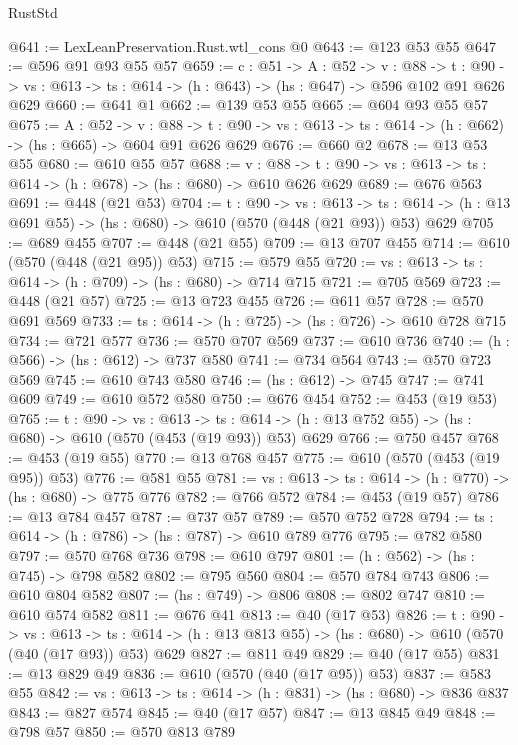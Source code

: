 \begin{lexlean}{RustStd}
\begin{coremodule}
@641 := LexLeanPreservation.Rust.wtl_cons @0
@643 := @123 @53 @55
@647 := @596 @91 @93 @55 @57
@659 := {c : @51} ->
  {A : @52} ->
  {v : @88} ->
  {t : @90} -> {vs : @613} -> {ts : @614} -> (h : @643) -> (hs : @647) -> @596 @102 @91 @626 @629
@660 := @641 @1
@662 := @139 @53 @55
@665 := @604 @93 @55 @57
@675 := {A : @52} ->
  {v : @88} ->
  {t : @90} -> {vs : @613} -> {ts : @614} -> (h : @662) -> (hs : @665) -> @604 @91 @626 @629
@676 := @660 @2
@678 := @13 @53 @55
@680 := @610 @55 @57
@688 := {v : @88} ->
  {t : @90} -> {vs : @613} -> {ts : @614} -> (h : @678) -> (hs : @680) -> @610 @626 @629
@689 := @676 @563
@691 := @448 (@21 @53)
@704 := {t : @90} ->
  {vs : @613} ->
  {ts : @614} -> (h : @13 @691 @55) -> (hs : @680) -> @610 (@570 (@448 (@21 @93)) @53) @629
@705 := @689 @455
@707 := @448 (@21 @55)
@709 := @13 @707 @455
@714 := @610 (@570 (@448 (@21 @95)) @53)
@715 := @579 @55
@720 := {vs : @613} -> {ts : @614} -> (h : @709) -> (hs : @680) -> @714 @715
@721 := @705 @569
@723 := @448 (@21 @57)
@725 := @13 @723 @455
@726 := @611 @57
@728 := @570 @691 @569
@733 := {ts : @614} -> (h : @725) -> (hs : @726) -> @610 @728 @715
@734 := @721 @577
@736 := @570 @707 @569
@737 := @610 @736
@740 := (h : @566) -> (hs : @612) -> @737 @580
@741 := @734 @564
@743 := @570 @723 @569
@745 := @610 @743 @580
@746 := (hs : @612) -> @745
@747 := @741 @609
@749 := @610 @572 @580
@750 := @676 @454
@752 := @453 (@19 @53)
@765 := {t : @90} ->
  {vs : @613} ->
  {ts : @614} -> (h : @13 @752 @55) -> (hs : @680) -> @610 (@570 (@453 (@19 @93)) @53) @629
@766 := @750 @457
@768 := @453 (@19 @55)
@770 := @13 @768 @457
@775 := @610 (@570 (@453 (@19 @95)) @53)
@776 := @581 @55
@781 := {vs : @613} -> {ts : @614} -> (h : @770) -> (hs : @680) -> @775 @776
@782 := @766 @572
@784 := @453 (@19 @57)
@786 := @13 @784 @457
@787 := @737 @57
@789 := @570 @752 @728
@794 := {ts : @614} -> (h : @786) -> (hs : @787) -> @610 @789 @776
@795 := @782 @580
@797 := @570 @768 @736
@798 := @610 @797
@801 := (h : @562) -> (hs : @745) -> @798 @582
@802 := @795 @560
@804 := @570 @784 @743
@806 := @610 @804 @582
@807 := (hs : @749) -> @806
@808 := @802 @747
@810 := @610 @574 @582
@811 := @676 @41
@813 := @40 (@17 @53)
@826 := {t : @90} ->
  {vs : @613} ->
  {ts : @614} -> (h : @13 @813 @55) -> (hs : @680) -> @610 (@570 (@40 (@17 @93)) @53) @629
@827 := @811 @49
@829 := @40 (@17 @55)
@831 := @13 @829 @49
@836 := @610 (@570 (@40 (@17 @95)) @53)
@837 := @583 @55
@842 := {vs : @613} -> {ts : @614} -> (h : @831) -> (hs : @680) -> @836 @837
@843 := @827 @574
@845 := @40 (@17 @57)
@847 := @13 @845 @49
@848 := @798 @57
@850 := @570 @813 @789

\end{coremodule}
\end{lexlean}
